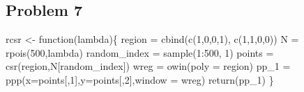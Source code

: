\documentclass[
  letterpaper,
  DIV=11,
  numbers=noendperiod]{scrartcl}
\newenvironment{Shaded}{\begin{snugshade}}{\end{snugshade}}
\newcommand{\AttributeTok}[1]{\textcolor[rgb]{0.40,0.45,0.13}{#1}}
\newcommand{\ControlFlowTok}[1]{\textcolor[rgb]{0.00,0.23,0.31}{#1}}
\newcommand{\DecValTok}[1]{\textcolor[rgb]{0.68,0.00,0.00}{#1}}
\newcommand{\FunctionTok}[1]{\textcolor[rgb]{0.28,0.35,0.67}{#1}}
\newcommand{\NormalTok}[1]{\textcolor[rgb]{0.00,0.23,0.31}{#1}}
\newcommand{\OtherTok}[1]{\textcolor[rgb]{0.00,0.23,0.31}{#1}}
\newcommand{\SpecialCharTok}[1]{\textcolor[rgb]{0.37,0.37,0.37}{#1}}
\newcommand{\StringTok}[1]{\textcolor[rgb]{0.13,0.47,0.30}{#1}}
\begin{document}
\hypertarget{problem-7}{%
\subsection{Problem 7}\label{problem-7}}

\begin{Shaded}
\begin{Highlighting}[]
\NormalTok{rcsr }\OtherTok{\textless{}{-}} \ControlFlowTok{function}\NormalTok{(lambda)\{}
\NormalTok{  region }\OtherTok{=} \FunctionTok{cbind}\NormalTok{(}\FunctionTok{c}\NormalTok{(}\DecValTok{1}\NormalTok{,}\DecValTok{0}\NormalTok{,}\DecValTok{0}\NormalTok{,}\DecValTok{1}\NormalTok{), }\FunctionTok{c}\NormalTok{(}\DecValTok{1}\NormalTok{,}\DecValTok{1}\NormalTok{,}\DecValTok{0}\NormalTok{,}\DecValTok{0}\NormalTok{))}
\NormalTok{  N }\OtherTok{=} \FunctionTok{rpois}\NormalTok{(}\DecValTok{500}\NormalTok{,lambda)}
\NormalTok{  random\_index }\OtherTok{=} \FunctionTok{sample}\NormalTok{(}\DecValTok{1}\SpecialCharTok{:}\DecValTok{500}\NormalTok{, }\DecValTok{1}\NormalTok{)}
\NormalTok{  points }\OtherTok{=} \FunctionTok{csr}\NormalTok{(region,N[random\_index])}
\NormalTok{  wreg }\OtherTok{=} \FunctionTok{owin}\NormalTok{(}\AttributeTok{poly =}\NormalTok{ region)}
\NormalTok{  pp\_1 }\OtherTok{=} \FunctionTok{ppp}\NormalTok{(}\AttributeTok{x=}\NormalTok{points[,}\DecValTok{1}\NormalTok{],}\AttributeTok{y=}\NormalTok{points[,}\DecValTok{2}\NormalTok{],}\AttributeTok{window =}\NormalTok{ wreg)}
  \FunctionTok{return}\NormalTok{(pp\_1)}
\NormalTok{\}}
\end{Highlighting}
\end{Shaded}

\begin{Shaded}
\end{Shaded}
\end{document}
